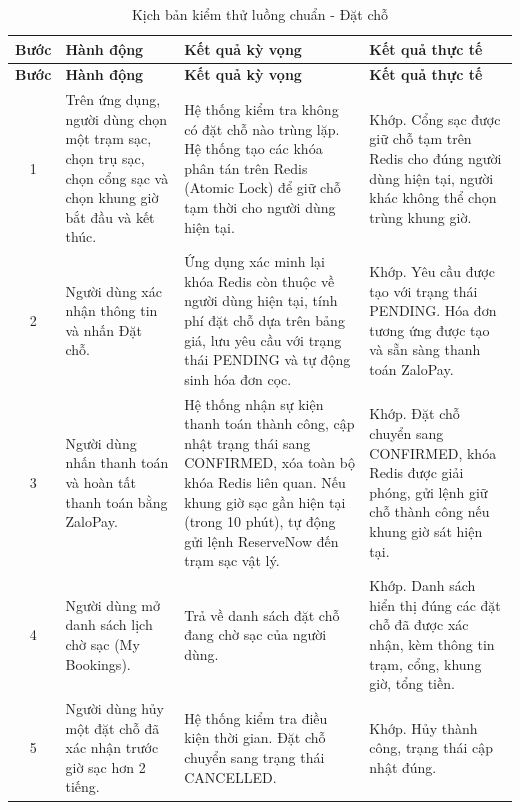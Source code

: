 \begin{center}
    \renewcommand{\arraystretch}{1.5}
    \begin{longtable}{|c|>{\raggedright\arraybackslash}m{}|>{\raggedright\arraybackslash}m{}|>{\raggedright\arraybackslash}m{}|}
        \caption{Kịch bản kiểm thử luồng chuẩn - Đặt chỗ}
        \label{tab:booking_happy} \\
        \hline
        \textbf{Bước} & \textbf{Hành động} & \textbf{Kết quả kỳ vọng} & \textbf{Kết quả thực tế} \\
        \hline
        \endfirsthead
        
        \hline
        \textbf{Bước} & \textbf{Hành động} & \textbf{Kết quả kỳ vọng} & \textbf{Kết quả thực tế} \\
        \hline
        \endhead
        
        1 & Trên ứng dụng, người dùng chọn một trạm sạc, chọn trụ sạc, chọn cổng sạc và chọn khung giờ bắt đầu và kết thúc. & Hệ thống kiểm tra không có đặt chỗ nào trùng lặp. Hệ thống tạo các khóa phân tán trên Redis (Atomic Lock) để giữ chỗ tạm thời cho người dùng hiện tại. & Khớp. Cổng sạc được giữ chỗ tạm trên Redis cho đúng người dùng hiện tại, người khác không thể chọn trùng khung giờ. \\
        \hline
        2 & Người dùng xác nhận thông tin và nhấn Đặt chỗ. & Ứng dụng xác minh lại khóa Redis còn thuộc về người dùng hiện tại, tính phí đặt chỗ dựa trên bảng giá, lưu yêu cầu với trạng thái PENDING và tự động sinh hóa đơn cọc. & Khớp. Yêu cầu được tạo với trạng thái PENDING. Hóa đơn tương ứng được tạo và sẵn sàng thanh toán ZaloPay. \\
        \hline
        3 & Người dùng nhấn thanh toán và hoàn tất thanh toán bằng ZaloPay. & Hệ thống nhận sự kiện thanh toán thành công, cập nhật trạng thái sang CONFIRMED, xóa toàn bộ khóa Redis liên quan. Nếu khung giờ sạc gần hiện tại (trong 10 phút), tự động gửi lệnh ReserveNow đến trạm sạc vật lý. & Khớp. Đặt chỗ chuyển sang CONFIRMED, khóa Redis được giải phóng, gửi lệnh giữ chỗ thành công nếu khung giờ sát hiện tại. \\
        \hline
        4 & Người dùng mở danh sách lịch chờ sạc (My Bookings). & Trả về danh sách đặt chỗ đang chờ sạc của người dùng. & Khớp. Danh sách hiển thị đúng các đặt chỗ đã được xác nhận, kèm thông tin trạm, cổng, khung giờ, tổng tiền. \\
        \hline
        5 & Người dùng hủy một đặt chỗ đã xác nhận trước giờ sạc hơn 2 tiếng. & Hệ thống kiểm tra điều kiện thời gian. Đặt chỗ chuyển sang trạng thái CANCELLED. & Khớp. Hủy thành công, trạng thái cập nhật đúng. \\
        \hline
    \end{longtable}
\end{center}

